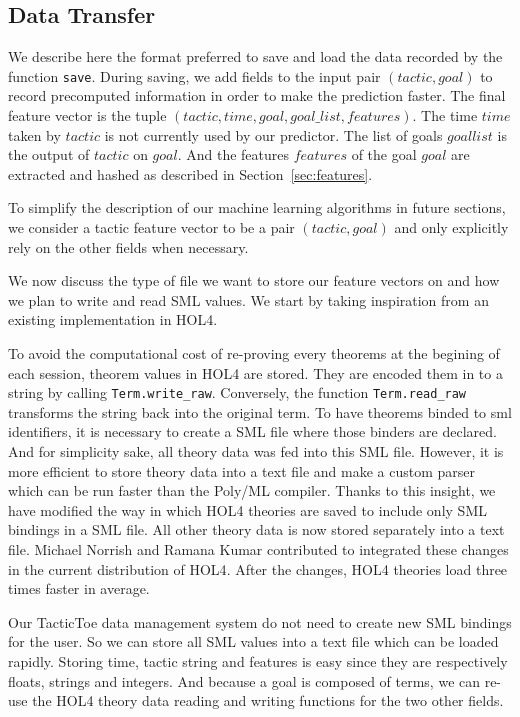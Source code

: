 \documentclass[runningheads,a4paper,draft]{svjour3}
\def\holfour{\textsf{HOL4}\xspace}
\def\sml{\textsf{SML}\xspace}
\def\polyml{\textsf{Poly/ML}\xspace}
\def\tactictoe{\textsf{TacticToe}\xspace}
\begin{document}
\subsection{Data Transfer}
We describe here the format preferred to save and load the 
data recorded by the function \texttt{save}. 
During saving, we add fields to the input pair $(tactic,goal)$ to record 
precomputed information in order to make the prediction faster. The final 
feature vector is the tuple $(tactic,time,goal,goal\_list,features)$.
The time $time$ taken by $tactic$ is not currently used by our 
predictor. The list of goals $goal list$ is the output of $tactic$ on 
$goal$. And the features $features$ of the goal $goal$ are extracted and hashed 
as described in Section~\ref{sec:features}. 

\begin{remark}
To simplify the description of our machine learning algorithms in future 
sections, we consider a tactic feature vector to be a pair $(tactic,goal)$ and 
only 
explicitly rely on the 
other fields when necessary.
\end{remark}

We now discuss the type of file we want to store our feature vectors on and
how we plan to write and read \sml values. We start by taking 
inspiration from an existing implementation in \holfour.

To avoid the computational cost of re-proving every theorems at the begining of 
each session, theorem values in \holfour are stored.
They are encoded them in to a string by calling \texttt{Term.write\_raw}.
Conversely, the function \texttt{Term.read\_raw} transforms the string back 
into the original term.
To have theorems binded to sml identifiers, it is necessary to create a 
\sml file where those binders are declared. And for simplicity sake, all theory 
data was fed into this \sml file. However, it is
more efficient to store theory data into a text file and make a custom 
parser which can be run faster than the \polyml compiler.
Thanks to this insight, we have 
modified the way in which \holfour theories are saved to include only \sml 
bindings in a \sml file. All other theory data is now stored separately 
into a text file. Michael Norrish and Ramana Kumar contributed to integrated 
these changes in the current distribution of \holfour. After the changes, 
\holfour theories load three times faster in average.

Our \tactictoe data management system do not need to create new \sml
bindings for the user. So we can store all \sml values into a text file which 
can be loaded rapidly.
Storing time, tactic string and features is easy since they are respectively 
floats, strings and integers. And because a goal is composed of terms, we can 
re-use the \holfour theory data reading and writing functions 
for the two other fields.
\end{document}
